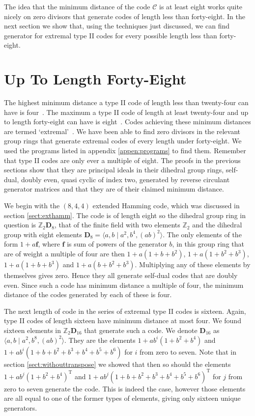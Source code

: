 The idea that the minimum distance of the code $\mathcal{C}$ is at least eight works quite nicely on zero divisors that generate codes of length less than forty-eight.
In the next section we show that, using the techniques just discussed, we can find generator for extremal type II codes for every possible length less than forty-eight.

\section{Up To Length Forty-Eight}
The highest minimum distance a type II code of length less than twenty-four can have is four~\cite[p.~346]{huf03}.
The maximum a type II code of length at least twenty-four and up to length forty-eight can have is eight~\cite[p.~346]{huf03}.
Codes achieving these minimum distances are termed `extremal'~\cite[p.~346]{huf03}.
We have been able to find zero divisors in the relevant group rings that generate extremal codes of every length under forty-eight.
We used the programs listed in appendix \ref{appen:programs} to find them.
Remember that type II codes are only ever a multiple of eight.
The proofs in the previous sections show that they are principal ideals in their dihedral group rings, self-dual, doubly even, quasi cyclic of index two, generated by reverse circulant generator matrices and that they are of their claimed minimum distance.

We begin with the $(8,4,4)$ extended Hamming code, which was discussed in section \ref{sect:exthamm}.
The code is of length eight so the dihedral group ring in question is $\mathbb{Z}_2 \mathbf{D}_8$, that of the finite field with two elements $\mathbb{Z}_2$ and the dihedral group with eight elements $\mathbf{D}_8 = \langle a , b \mid a^2 , b^4 , (ab)^2 \rangle$.
The only elements of the form $1 + a \mathbf{f}$, where $\mathbf{f}$ is sum of powers of the generator $b$, in this group ring that are of weight a multiple of four are then $1 + a (1 + b + b^2)$, $1 + a ( 1 + b^2 + b^3 )$, $1 + a ( 1 + b + b^3)$ and $1 + a ( b + b^2 + b^3 )$.
Multiplying any of these elements by themselves gives zero.
Hence they all generate self-dual codes that are doubly even.
Since such a code has minimum distance a multiple of four, the minimum distance of the codes generated by each of these is four.

The next length of code in the series of extremal type II codes is sixteen.
Again, type II codes of length sixteen have minimum distance at most four.
We found sixteen elements in $\mathbb{Z}_2 \mathbf{D}_{16}$ that generate such a code.
We denote $\mathbf{D}_{16}$ as $\langle a , b \mid a^2 , b^8 , (ab)^2 \rangle$.
They are the elements $1 + a b^i ( 1 + b^2 + b^4)$ and $1 + a b^i ( 1 + b + b^2 + b^3 + b^4 + b^5 + b^6)$ for $i$ from zero to seven.
Note that in section \ref{sect:withouttranspose} we showed that then so should the elements $1 + a b^j (1 + b^2 + b^4)^{\textrm{T}}$ and $1 + a b^j ( 1 + b + b^2 + b^3 + b^4 + b^5 + b^6)^{\textrm{T}}$ for $j$ from zero to seven generate the code.
This is indeed the case, however those elements are all equal to one of the former types of elements, giving only sixteen unique generators.

